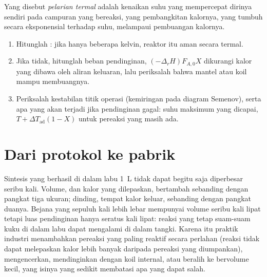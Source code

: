 \begin{definition}\label{def:b2:continuous-reactors:runaway}
Yang disebut \emph{pelarian termal} adalah kenaikan
suhu yang mempercepat dirinya sendiri pada campuran yang bereaksi, yang
pembangkitan kalornya, yang tumbuh secara eksponensial terhadap suhu,
melampaui pembuangan kalornya.
\end{definition}

\begin{method}\label{met:b2:continuous-reactors:heat-balance}
\begin{enumerate}
  \item Hitunglah : jika hanya beberapa kelvin,
        reaktor itu aman secara termal.
  \item Jika tidak, hitunglah beban pendinginan, $(-\Delta_r H)F_{A,0}X$
        dikurangi kalor yang dibawa oleh aliran keluaran, lalu periksalah
        bahwa mantel atau koil mampu membuangnya.
  \item Periksalah kestabilan titik operasi (kemiringan pada diagram
        Semenov), serta apa yang akan terjadi jika pendinginan gagal: suhu
        maksimum yang dicapai, $T + \Delta T_{\text{ad}}(1 - X)$ untuk
        pereaksi yang masih ada.
\end{enumerate}
\end{method}

\section{Dari protokol ke pabrik}

Sintesis yang berhasil di dalam labu \qty{1}{L} tidak dapat begitu saja
diperbesar seribu kali. Volume, dan kalor yang dilepaskan, bertambah
sebanding dengan pangkat tiga ukuran; dinding, tempat kalor keluar,
sebanding dengan pangkat duanya. Bejana yang sepuluh kali lebih lebar
mempunyai volume seribu kali lipat tetapi luas pendinginan hanya seratus
kali lipat: reaksi yang tetap suam-suam kuku di dalam labu dapat
mengalami  di dalam tangki. Karena itu praktik industri
menambahkan pereaksi yang paling reaktif secara perlahan (reaksi tidak
dapat melepaskan kalor lebih banyak daripada pereaksi yang diumpankan),
mengencerkan, mendinginkan dengan koil internal, atau beralih ke  bervolume kecil, yang isinya yang sedikit membatasi apa yang
dapat salah.

